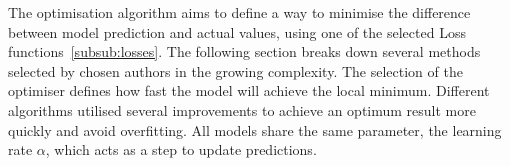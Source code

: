 The optimisation algorithm aims to define a way to minimise the difference between model prediction and actual values, using one of the selected Loss functions~\ref{subsub:losses}.
The following section breaks down several methods selected by chosen authors in the growing complexity.
The selection of the optimiser defines how fast the model will achieve the local minimum.
Different algorithms utilised several improvements to achieve an optimum result more quickly and avoid overfitting.
All models share the same parameter, the learning rate $\alpha$, which acts as a step to update predictions.

